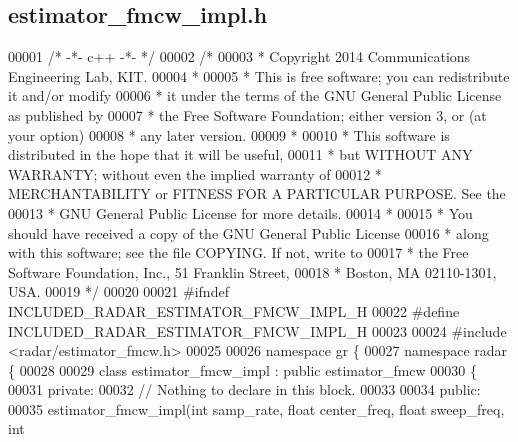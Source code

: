 \subsection{estimator\+\_\+fmcw\+\_\+impl.\+h}
\label{estimator__fmcw__impl_8h_source}

\begin{DoxyCode}
00001 \textcolor{comment}{/* -*- c++ -*- */}
00002 \textcolor{comment}{/* }
00003 \textcolor{comment}{ * Copyright 2014 Communications Engineering Lab, KIT.}
00004 \textcolor{comment}{ * }
00005 \textcolor{comment}{ * This is free software; you can redistribute it and/or modify}
00006 \textcolor{comment}{ * it under the terms of the GNU General Public License as published by}
00007 \textcolor{comment}{ * the Free Software Foundation; either version 3, or (at your option)}
00008 \textcolor{comment}{ * any later version.}
00009 \textcolor{comment}{ * }
00010 \textcolor{comment}{ * This software is distributed in the hope that it will be useful,}
00011 \textcolor{comment}{ * but WITHOUT ANY WARRANTY; without even the implied warranty of}
00012 \textcolor{comment}{ * MERCHANTABILITY or FITNESS FOR A PARTICULAR PURPOSE.  See the}
00013 \textcolor{comment}{ * GNU General Public License for more details.}
00014 \textcolor{comment}{ * }
00015 \textcolor{comment}{ * You should have received a copy of the GNU General Public License}
00016 \textcolor{comment}{ * along with this software; see the file COPYING.  If not, write to}
00017 \textcolor{comment}{ * the Free Software Foundation, Inc., 51 Franklin Street,}
00018 \textcolor{comment}{ * Boston, MA 02110-1301, USA.}
00019 \textcolor{comment}{ */}
00020  
00021 \textcolor{preprocessor}{#ifndef INCLUDED\_RADAR\_ESTIMATOR\_FMCW\_IMPL\_H}
00022 \textcolor{preprocessor}{#define INCLUDED\_RADAR\_ESTIMATOR\_FMCW\_IMPL\_H}
00023 
00024 \textcolor{preprocessor}{#include <radar/estimator_fmcw.h>}
00025 
00026 \textcolor{keyword}{namespace }gr \{
00027   \textcolor{keyword}{namespace }radar \{
00028 
00029     \textcolor{keyword}{class }estimator_fmcw_impl : \textcolor{keyword}{public} estimator_fmcw
00030     \{
00031      \textcolor{keyword}{private}:
00032       \textcolor{comment}{// Nothing to declare in this block.}
00033 
00034      \textcolor{keyword}{public}:
00035       estimator_fmcw_impl(\textcolor{keywordtype}{int} samp_rate, \textcolor{keywordtype}{float} center_freq, \textcolor{keywordtype}{float} sweep_freq, \textcolor{keywordtype}{int} 

\end{DoxyCode}
